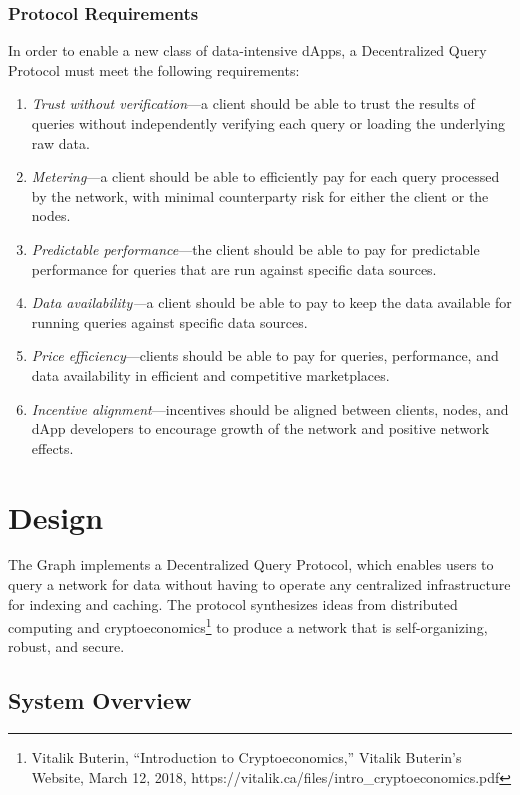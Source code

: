 \documentclass[12pt]{article}
\begin{document}
\subsubsection*{Protocol Requirements}
In order to enable a new class of data-intensive dApps, a Decentralized Query Protocol must meet the following requirements:
\begin{enumerate}
\item \textit{Trust without verification}---a client should be able to trust the results of queries without independently verifying each query or loading the underlying raw data.
\item \textit{Metering}---a client should be able to efficiently pay for each query processed by the network, with minimal counterparty risk for either the client or the nodes.
\item \textit{Predictable performance}---the client should be able to pay for predictable performance for queries that are run against specific data sources.
\item \textit{Data availability---}a client should be able to pay to keep the data available for running queries against specific data sources.
\item \textit{Price efficiency}---clients should be able to pay for queries, performance, and data availability in efficient and competitive marketplaces.
\item \textit{Incentive alignment}---incentives should be aligned between clients, nodes, and dApp developers to encourage growth of the network and positive network effects.
\end{enumerate}
\section{Design}
The Graph implements a Decentralized Query Protocol, which enables users to query a network for data without having to operate any centralized infrastructure for indexing and caching. The protocol synthesizes ideas from distributed computing and cryptoeconomics\footnote{Vitalik Buterin, ``Introduction to Cryptoeconomics,'' Vitalik Buterin's Website, March 12, 2018,
https://vitalik.ca/files/intro\_cryptoeconomics.pdf} to produce a network that is self-organizing, robust, and secure.
\subsection{System Overview}
\end{document}
